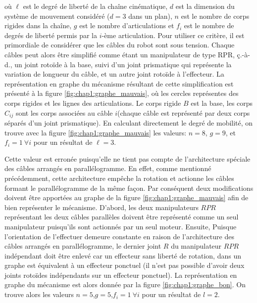 où $\ell$ est le degré de liberté de la chaîne cinématique, $d$ est la dimension du système de mouvement considéré ($d = 3$ dans un plan), $n$ est le nombre de corps rigides dans la chaîne, $g$ est le nombre d'articulations et $f_i$ est le nombre de degrés de liberté permis par la $i$-ème articulation. Pour utiliser ce critère, il est primordiale de considérer que les câbles du robot sont sous tension. Chaque câbles peut alors être simplifié comme étant un manipulateur de type RPR, ç.-à-d., un joint rotoïde à la base, suivi d'un joint prismatique qui représente la variation de longueur du câble, et un autre joint rotoïde à l'effecteur. La représentation en graphe du mécanisme résultant de cette simplification est présenté à la figure \ref{fig:chap1:graphe_mauvais}, où les cercles représentes des corps rigides et les lignes des articulations. Le corps rigide $B$ est la base, les corps $C_{ij}$ sont les corps associées au câble $i$(chaque câble est représenté par deux corps séparés d'un joint prismatique). En calculant directement le degré de mobilité, on trouve avec la figure \ref{fig:chap1:graphe_mauvais} les valeurs: $n = 8$, $g = 9$, et $f_i=1 \ \forall i$ pour un résultat de $\ell=3$.\par Cette valeur est erronée puisqu'elle ne tient pas compte de l'architecture spéciale des câbles arrangés en parallélogramme. En effet, comme mentionné précédemment, cette architecture empêche la rotation et actionne les câbles formant le parallélogramme de la même façon. Par conséquent deux modifications doivent être apportées au graphe de la figure \ref{fig:chap1:graphe_mauvais} afin de bien représenter le mécanisme. D'abord, les deux manipulateurs $RPR$ représentant les deux câbles parallèles doivent être représenté comme un seul manipulateur puisqu'ils sont actionnés par un seul moteur. Ensuite, Puisque l'orientation de l'effectuer demeure constante en raison de l'architecture des câbles arrangés en parallélogramme, le dernier joint $R$ du manipulateur $RPR$ indépendant doit être enlevé car un effecteur sans liberté de rotation, dans un graphe est équivalent à un effecteur ponctuel (il n'est pas possible d'avoir deux joints rotoïdes indépendants sur un effecteur ponctuel). La représentation en graphe du mécanisme est alors donnée par la figure \ref{fig:chap1:graphe_bon}. On trouve alors les valeurs $n=5$,$g=5$,$f_i=1\ \forall i$ pour un résultat de $l=2$.
